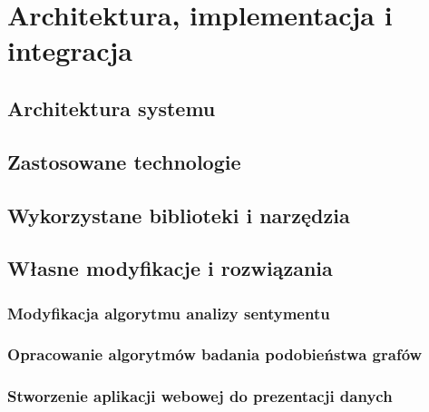 \chapter{Architektura, implementacja i integracja}
\begin{comment}
- moduły
- szczegóły
- baza danych
\end{comment}
\section{Architektura systemu}
\section{Zastosowane technologie}
\section{Wykorzystane biblioteki i narzędzia}
\section{Własne modyfikacje i rozwiązania}
\subsection{Modyfikacja algorytmu analizy sentymentu}
\subsection{Opracowanie algorytmów badania podobieństwa grafów}
\subsection{Stworzenie aplikacji webowej do prezentacji danych}